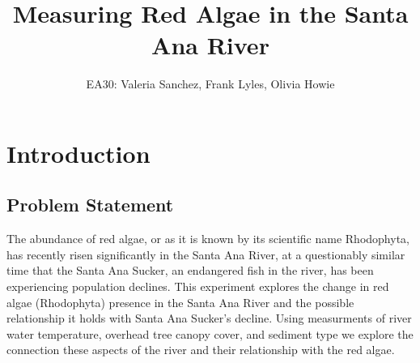 \documentclass{article}
\title{Measuring Red Algae in the Santa Ana River}
\author{EA30: Valeria Sanchez, Frank Lyles, Olivia Howie}
\begin{document}



\maketitle

\newpage
\tableofcontents
\newpage

\section{Introduction}


\subsection{Problem Statement}
The abundance of red algae, or as it is known by its scientific name Rhodophyta, has recently risen significantly in the Santa Ana River, at a questionably similar time that the Santa Ana Sucker, an endangered fish in the river, has been experiencing population declines. This experiment explores the change in red algae (Rhodophyta) presence in the Santa Ana River and the possible relationship it holds with Santa Ana Sucker's decline. Using measurments of river water temperature, overhead tree canopy cover, and sediment type we explore the connection these aspects of the river and their relationship with the red algae.
\end{document}
